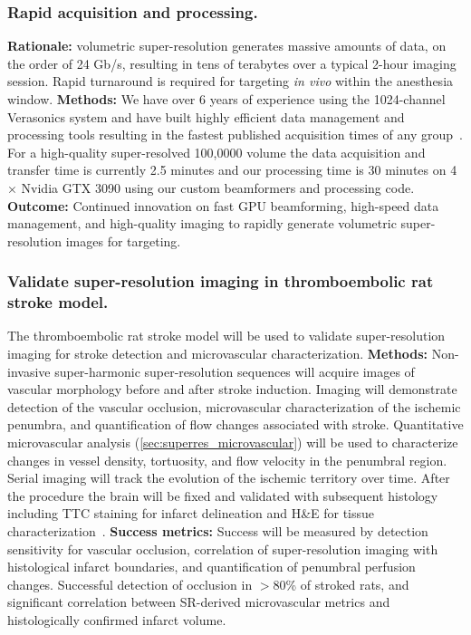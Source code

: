 \subsubsection{Rapid acquisition and processing.\label{sec:rapid}} \textbf{Rationale:} volumetric super-resolution generates massive amounts of data, on the order of 24 Gb/s, resulting in tens of terabytes over a typical 2-hour imaging session. Rapid turnaround is required for targeting \textit{in vivo} within the anesthesia window. \textbf{Methods:} We have over 6 years of experience using the 1024-channel Verasonics system and have built highly efficient data management and processing tools resulting in the fastest published acquisition times of any group~\cite{mccall2023non}. For a high-quality super-resolved 100,0000 volume the data acquisition and transfer time is currently 2.5 minutes and our processing time is 30 minutes on 4 $\times$ Nvidia GTX 3090 using our custom beamformers and processing code.  \textbf{Outcome:} Continued innovation on fast GPU beamforming, high-speed data management, and high-quality imaging to rapidly generate volumetric super-resolution images for targeting. 

\subsubsection{Validate super-resolution imaging in thromboembolic rat stroke model.} The thromboembolic rat stroke model will be used to validate super-resolution imaging for stroke detection and microvascular characterization. \textbf{Methods:} Non-invasive super-harmonic super-resolution sequences will acquire images of vascular morphology before and after stroke induction. Imaging will demonstrate detection of the vascular occlusion, microvascular characterization of the ischemic penumbra, and quantification of flow changes associated with stroke. Quantitative microvascular analysis (\ref{sec:superres_microvascular}) will be used to characterize changes in vessel density, tortuosity, and flow velocity in the penumbral region. Serial imaging will track the evolution of the ischemic territory over time. After the procedure the brain will be fixed and validated with subsequent histology including TTC staining for infarct delineation and H\&E for tissue characterization~\cite{hurt2023genomically,bar2021acoustically}. \textbf{Success metrics:} Success will be measured by detection sensitivity for vascular occlusion, correlation of super-resolution imaging with histological infarct boundaries, and quantification of penumbral perfusion changes. Successful detection of occlusion in $>$80\% of stroked rats, and significant correlation between SR-derived microvascular metrics and histologically confirmed infarct volume.
